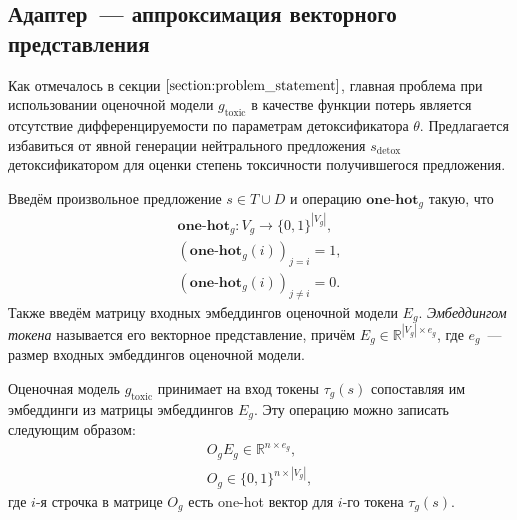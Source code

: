 \subsection{Адаптер~--- аппроксимация векторного представления} 
\label{section:adapter_defenition}
Как отмечалось в секции $\ref{section:problem_statement}$, главная проблема при использовании оценочной модели $g_{\text{toxic}}$ в качестве функции потерь является отсутствие дифференцируемости по параметрам детоксификатора $\theta$.
Предлагается избавиться от явной генерации нейтрального предложения $s_{\text{detox}}$ детоксификатором для оценки степень токсичности получившегося предложения.

Введём произвольное предложение $s \in T \cup D$ и операцию $\textbf{one-hot}_{g}$ такую, что 
\begin{gather*}
    \textbf{one-hot}_{g}: V_{g} \to \{0, 1\}^{|V_{g}|}, \\ 
    \left(\textbf{one-hot}_{g} (i)\right)_{j = i} = 1, \\ 
    \left(\textbf{one-hot}_{g} (i)\right)_{j \not= i} = 0. 
\end{gather*}
Также введём матрицу входных эмбеддингов оценочной модели $E_g$. 
\textit{Эмбеддингом токена} называется его векторное представление, причём $E_g \in \mathbb{R}^{|V_g| \times e_g}$, где $e_g$~--- размер входных эмбеддингов оценочной модели.

Оценочная модель $g_{\text{toxic}}$ принимает на вход токены $\tau_{g}(s)$ сопоставляя им эмбеддинги из матрицы эмбеддингов $E_g $.
Эту операцию можно записать следующим образом:
\begin{gather*}
    O_{g} E_g \in \mathbb{R}^{n \times e_g}, \\
    O_{g} \in \{0, 1\}^{n \times |V_g|},
\end{gather*}
где $i$-я строчка в матрице $O_{g}$ есть one-hot вектор для $i$-го токена  $\tau_{g}(s)$.

